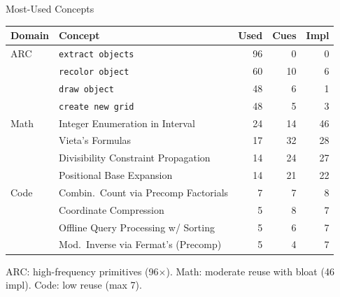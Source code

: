 \documentclass[10pt]{beamer}
\begin{document}
\begin{frame}{Most-Used Concepts}
  \begin{table}
    \scriptsize
    \begin{tabular}{@{} l l r r r @{}}
      \toprule
      Domain & Concept & Used & Cues & Impl \\
      \midrule
      \textcolor{arcblue}{ARC} & \texttt{extract objects} & 96 & 0 & 0 \\
      & \texttt{recolor object} & 60 & 10 & 6 \\
      & \texttt{draw object} & 48 & 6 & 1 \\
      & \texttt{create new grid} & 48 & 5 & 3 \\
      \midrule
      \textcolor{mathgreen}{Math} & Integer Enumeration in Interval & 24 & 14 & 46 \\
      & Vieta's Formulas & 17 & 32 & 28 \\
      & Divisibility Constraint Propagation & 14 & 24 & 27 \\
      & Positional Base Expansion & 14 & 21 & 22 \\
      \midrule
      \textcolor{codeorange}{Code} & Combin.~Count via Precomp Factorials & 7 & 7 & 8 \\
      & Coordinate Compression & 5 & 8 & 7 \\
      & Offline Query Processing w/ Sorting & 5 & 6 & 7 \\
      & Mod.~Inverse via Fermat's (Precomp) & 5 & 4 & 7 \\
      \bottomrule
    \end{tabular}
  \end{table}

  \vspace{0.3em}
  ARC: high-frequency primitives (96$\times$). Math: moderate reuse with bloat (46 impl). Code: low reuse (max 7).
\end{frame}
\end{document}

